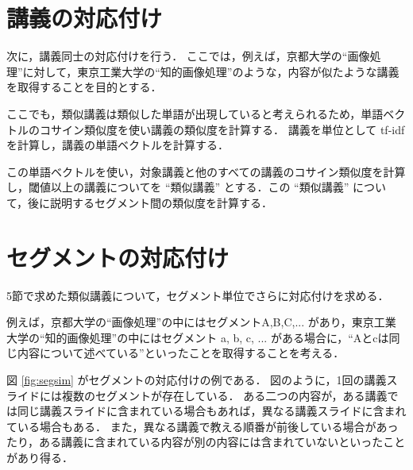 \documentclass{js}
\begin{document}
\section{講義の対応付け}\label{sec:lecture-sim}

次に，講義同士の対応付けを行う．
ここでは，例えば，京都大学の``画像処理''に対して，東京工業大学の``知的画像処理''のような，内容が似たような講義を取得することを目的とする．

ここでも，類似講義は類似した単語が出現していると考えられるため，単語ベクトルのコサイン類似度を使い講義の類似度を計算する．
講義を単位として tf-idfを計算し，講義の単語ベクトルを計算する．

この単語ベクトルを使い，対象講義と他のすべての講義のコサイン類似度を計算し，閾値以上の講義についてを ``類似講義'' とする．この ``類似講義'' について，後に説明するセグメント間の類似度を計算する．

\section{セグメントの対応付け}\label{sec:segment-sim}

5節で求めた類似講義について，セグメント単位でさらに対応付けを求める．

例えば，京都大学の``画像処理''の中にはセグメントA,B,C,... があり，東京工業大学の``知的画像処理''の中にはセグメント a, b, c, ... がある場合に，``Aとcは同じ内容について述べている''といったことを取得することを考える．

図 \ref{fig:segsim} がセグメントの対応付けの例である．
図のように，1回の講義スライドには複数のセグメントが存在している．
ある二つの内容が，ある講義では同じ講義スライドに含まれている場合もあれば，異なる講義スライドに含まれている場合もある．
また，異なる講義で教える順番が前後している場合があったり，ある講義に含まれている内容が別の内容には含まれていないといったことがあり得る．
\end{document}
